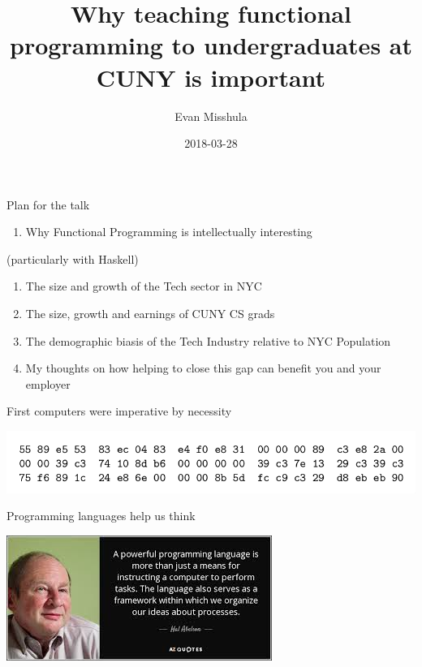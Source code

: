 \documentclass[presetation]{beamer}
\author{Evan Misshula}
\date{2018-03-28}
\title{Why teaching functional programming to undergraduates at CUNY is important}
\begin{document}
\maketitle

\begin{frame}[label={sec:org010f9fd}]{Plan for the talk}
\begin{enumerate}
\item Why Functional Programming is intellectually interesting
\end{enumerate}
\pause   
(particularly with Haskell)
\pause
\begin{enumerate}
\item The size and growth of the Tech sector in NYC
\item The size, growth and earnings of CUNY CS grads
\item The demographic biasis of the Tech Industry relative to NYC Population
\item My thoughts on how helping to close this gap can benefit you and
your employer
\end{enumerate}
\end{frame}


\begin{frame}[label={sec:orgd595cf1}]{First computers were imperative by necessity}
\begin{center}
\includegraphics[width=.9\linewidth]{./images/machineCode.png}
\end{center}
\end{frame}

\begin{frame}[label={sec:org48b670e}]{Programming languages help us think}
\begin{center}
\includegraphics[width=.9\linewidth]{./images/lang.jpeg}
\end{center}
\end{frame}
\end{document}
